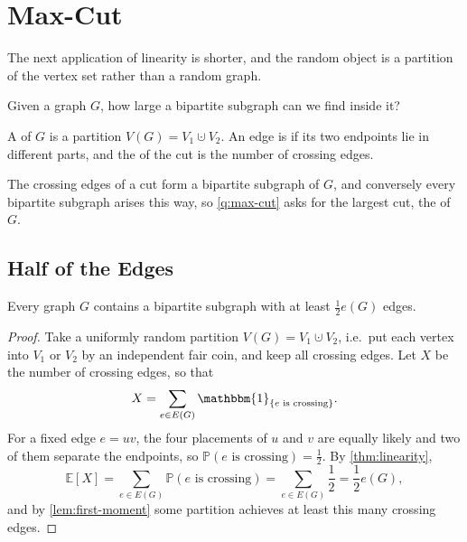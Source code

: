 \section{Max-Cut}\label{sec:max-cut}

The next application of linearity is shorter, and the random object is a partition of the vertex set rather than a random graph.

\begin{question}\label{q:max-cut}
    Given a graph \(G\), how large a bipartite subgraph can we find inside it?
\end{question}

\begin{definition}[Cut]\label{def:cut}
    A  of \(G\) is a partition \(V(G) = V_1 \cupdot V_2\). An edge is  if its two endpoints lie in different parts, and the  of the cut is the number of crossing edges.
\end{definition}

The crossing edges of a cut form a bipartite subgraph of \(G\), and conversely every bipartite subgraph arises this way, so \autoref{q:max-cut} asks for the largest cut, the  of \(G\).

\subsection{Half of the Edges}

\begin{proposition}\label{prop:max-cut-half}
    Every graph \(G\) contains a bipartite subgraph with at least \(\frac{1}{2} e(G)\) edges.
\end{proposition}

\begin{proof}
    Take a uniformly random partition \(V(G) = V_1 \cupdot V_2\), i.e.\ put each vertex into \(V_1\) or \(V_2\) by an independent fair coin, and keep all crossing edges. Let \(X\) be the number of crossing edges, so that
    \[
        X = \sum_{e \in E(G)} \mathbbm{1}_{\{e \text{ is crossing}\}}.
    \]
    For a fixed edge \(e = uv\), the four placements of \(u\) and \(v\) are equally likely and two of them separate the endpoints, so \(\mathbb{P}(e \text{ is crossing}) = \frac{1}{2}\). By \autoref{thm:linearity},
    \[
        \mathbb{E}[X] = \sum_{e \in E(G)} \mathbb{P}(e \text{ is crossing}) = \sum_{e \in E(G)} \frac{1}{2} = \frac{1}{2} e(G),
    \]
    and by \autoref{lem:first-moment} some partition achieves at least this many crossing edges.
\end{proof}

